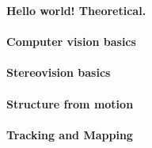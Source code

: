 \documentclass[../../../../main]{subfiles}
\begin{document}
\textbf{Hello world! Theoretical.}

\paragraph{Computer vision basics}

\newpage

\paragraph{Stereovision basics}

\newpage

\paragraph{Structure from motion}

\newpage

\paragraph{Tracking and Mapping}

\newpage
\end{document}
